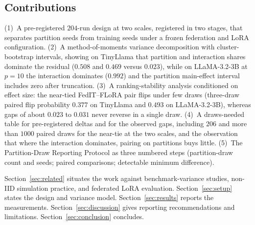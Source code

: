 \subsection{Contributions}
(1)~A pre-registered $204$-run design at two scales, registered in two stages, that separates partition seeds from training seeds under a frozen federation and LoRA configuration. (2)~A method-of-moments variance decomposition with cluster-bootstrap intervals, showing on TinyLlama that partition and interaction shares dominate the residual ($0.508$ and $0.469$ versus $0.023$), while on LLaMA-3.2-3B at $p{=}10$ the interaction dominates ($0.992$) and the partition main-effect interval includes zero after truncation. (3)~A ranking-stability analysis conditioned on effect size: the near-tied FedIT--FLoRA pair flips under few draws (three-draw paired flip probability $0.377$ on TinyLlama and $0.493$ on LLaMA-3.2-3B), whereas gaps of about $0.023$ to $0.031$ never reverse in a single draw. (4)~A draws-needed table for pre-registered deltas and for the observed gaps, including $206$ and more than $1000$ paired draws for the near-tie at the two scales, and the observation that where the interaction dominates, pairing on partitions buys little. (5)~The Partition-Draw Reporting Protocol as three numbered steps (partition-draw count and seeds; paired comparisons; detectable minimum difference).

Section~\ref{sec:related} situates the work against benchmark-variance studies, non-IID simulation practice, and federated LoRA evaluation. Section~\ref{sec:setup} states the design and variance model. Section~\ref{sec:results} reports the measurements. Section~\ref{sec:discussion} gives reporting recommendations and limitations. Section~\ref{sec:conclusion} concludes.
